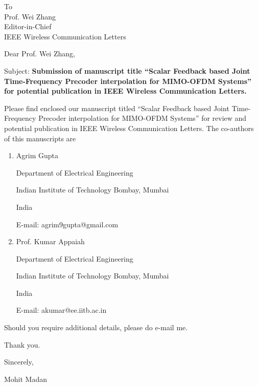 \documentclass{letter}
\date{\today}
\begin{document}
\begin{letter}{To\\
Prof. Wei Zhang\\
Editor-in-Chief\\
IEEE Wireless Communication Letters}
\vspace{0.5in}


\opening{Dear Prof. Wei Zhang,}

Subject: \textbf{Submission of manuscript title ``Scalar Feedback based Joint Time-Frequency Precoder
  interpolation for  MIMO-OFDM Systems'' for potential publication in
  IEEE Wireless Communication Letters.}

Please find enclosed our manuscript titled ``Scalar Feedback based Joint Time-Frequency Precoder
  interpolation for  MIMO-OFDM Systems'' for review and potential
  publication in IEEE Wireless Communication Letters. The co-authors of this manuscripts are
\begin{enumerate}
\item  Agrim Gupta

Department of Electrical  Engineering

Indian Institute of Technology Bombay, Mumbai

India

E-mail: agrim9gupta@gmail.com


\item Prof. Kumar Appaiah

Department of Electrical  Engineering

Indian Institute of Technology Bombay, Mumbai

India

E-mail: akumar@ee.iitb.ac.in

\end{enumerate}

Should you require additional details, please do e-mail me.

Thank you.
\vspace{0.3in}

Sincerely,

Mohit Madan

\end{letter}
\end{document}
